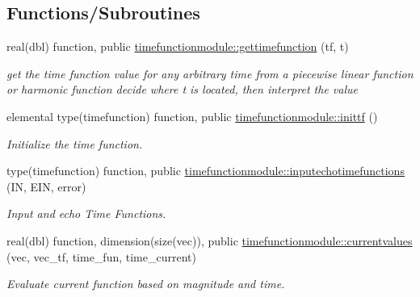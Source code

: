 \subsection*{Functions/\+Subroutines}
\begin{DoxyCompactItemize}
\item 
real(dbl) function, public \hyperlink{namespacetimefunctionmodule_a177d2096c59b79cbbfd85b4e05b57f29}{timefunctionmodule\+::gettimefunction} (tf, t)
\begin{DoxyCompactList}\small\item\em get the time function value for any arbitrary time from a piecewise linear function or harmonic function decide where t is located, then interpret the value \end{DoxyCompactList}\item 
elemental type(timefunction) function, public \hyperlink{namespacetimefunctionmodule_a4a9a0cfa8fd5fc6dcfd21c0eeed2a027}{timefunctionmodule\+::inittf} ()
\begin{DoxyCompactList}\small\item\em Initialize the time function. \end{DoxyCompactList}\item 
type(timefunction) function, public \hyperlink{namespacetimefunctionmodule_a9dc9317deeac617a45cf48f6101f11d2}{timefunctionmodule\+::inputechotimefunctions} (IN, E\+IN, error)
\begin{DoxyCompactList}\small\item\em Input and echo Time Functions. \end{DoxyCompactList}\item 
real(dbl) function, dimension(size(vec)), public \hyperlink{namespacetimefunctionmodule_a907e0921288aa4f538e605c521686e4a}{timefunctionmodule\+::currentvalues} (vec, vec\+\_\+tf, time\+\_\+fun, time\+\_\+current)
\begin{DoxyCompactList}\small\item\em Evaluate current function based on magnitude and time. \end{DoxyCompactList}\end{DoxyCompactItemize}
